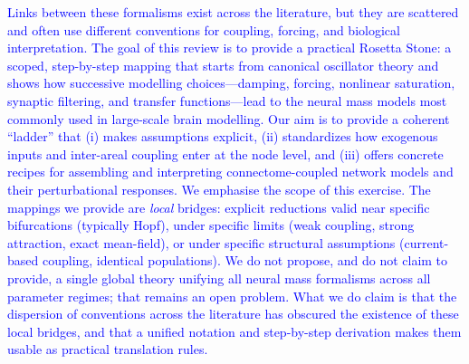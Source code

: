 \documentclass[12pt]{article}
\numberwithin{equation}{section}
\newcommand{\rev}[1]{\textcolor{blue}{#1}}
\begin{document}
\rev{Links between these formalisms exist across the literature, but they are scattered and often use different conventions for coupling, forcing, and biological interpretation. The goal of this review is to provide a practical Rosetta Stone: a scoped, step-by-step mapping that starts from canonical oscillator theory and shows how successive modelling choices—damping, forcing, nonlinear saturation, synaptic filtering, and transfer functions—lead to the neural mass models most commonly used in large-scale brain modelling. Our aim is to provide a coherent “ladder” that (i) makes assumptions explicit, (ii) standardizes how exogenous inputs and inter-areal coupling enter at the node level, and (iii) offers concrete recipes for assembling and interpreting connectome-coupled network models and their perturbational responses.
We emphasise the scope of this exercise. The mappings we provide are \emph{local} bridges: explicit reductions valid near specific bifurcations (typically Hopf), under specific limits (weak coupling, strong attraction, exact mean-field), or under specific structural assumptions (current-based coupling, identical populations). We do not propose, and do not claim to provide, a single global theory unifying all neural mass formalisms across all parameter regimes; that remains an open problem. What we do claim is that the dispersion of conventions across the literature has obscured the existence of these local bridges, and that a unified notation and step-by-step derivation makes them usable as practical translation rules.}
\end{document}
